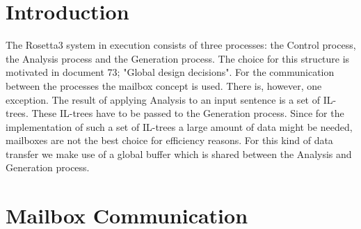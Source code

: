 
   \RosKeywords{}
   \MakeRosTitle
\section{Introduction}
The Rosetta3 system in execution 
consists of three processes: the Control process, the 
Analysis process and the Generation process. The choice for this structure is
motivated in document 73; "Global design decisions".
For the communication between the processes the mailbox concept is used.
There is, 
however, one exception. The result of applying Analysis to an input sentence is
a set of IL-trees. These IL-trees have to be passed to the Generation process.
Since for the implementation of such a set of IL-trees a large amount of data 
might be needed, mailboxes are not the best choice for efficiency
reasons. For this kind of data transfer we make use of a
global buffer which is shared between the Analysis and Generation process.


\section{Mailbox Communication}
